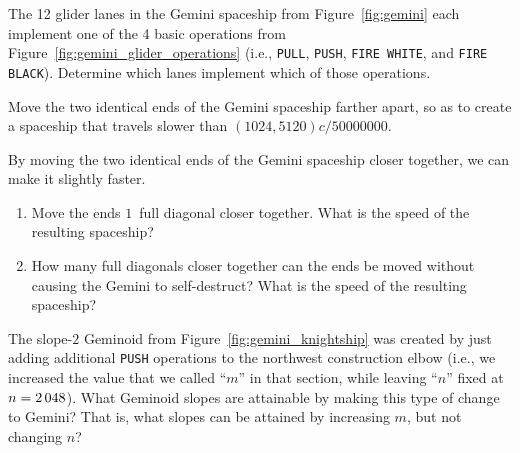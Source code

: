 \begin{multicols}{2}
	
	\mfilbreak
	
	
	\begin{problem}\label{exer:gemini_which_lane_operations}
		The 12 glider lanes in the Gemini spaceship from Figure~\ref{fig:gemini} each implement one of the 4 basic operations from Figure~\ref{fig:gemini_glider_operations} (i.e., \texttt{PULL}, \texttt{PUSH}, \texttt{FIRE WHITE}, and \texttt{FIRE BLACK}). Determine which lanes implement which of those operations.
	\end{problem}
	
	
	\mfilbreak
	
	
	\begin{problem}\label{exer:gemini_separate_ends_slow}
		Move the two identical ends of the Gemini spaceship farther apart, so as to create a spaceship that travels slower than $(1024,5120)c/50000000$.
	\end{problem}
	
	
	\mfilbreak
	
	
	\begin{problemstar}\label{exer:squeeze_gemini_how_far}
		By moving the two identical ends of the Gemini spaceship closer together, we can make it slightly faster.
		
		\begin{enumerate}[label=\bf\color{ocre}(\alph*)]
			\item Move the ends $1$~full diagonal closer together. What is the speed of the resulting spaceship?
			
			\item How many full diagonals closer together can the ends be moved without causing the Gemini to self-destruct? What is the speed of the resulting spaceship?
		\end{enumerate}
	\end{problemstar}
	
	
	\mfilbreak
	
	
	\begin{problemstar}\label{exer:gemini_slope_n_fixed}
		The slope-$2$ Geminoid from Figure~\ref{fig:gemini_knightship} was created by just adding additional \texttt{PUSH} operations to the northwest construction elbow (i.e., we increased the value that we called ``$m$'' in that section, while leaving ``$n$'' fixed at $n = 2{\,}048$). What Geminoid slopes are attainable by making this type of change to Gemini? That is, what slopes can be attained by increasing $m$, but not changing $n$?
	\end{problemstar}
	

\end{multicols}
